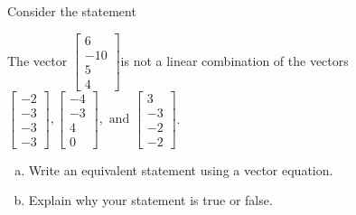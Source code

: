 
\begin{exerciseStatement}


Consider the statement 
\begin{center}\begin{minipage}{0.8\textwidth}
 The vector \( \left[\begin{array}{c}
6 \\
-10 \\
5 \\
4
\end{array}\right] \)is not a linear combination of the vectors \( \left[\begin{array}{c}
-2 \\
-3 \\
-3 \\
-3
\end{array}\right] , \left[\begin{array}{c}
-4 \\
-3 \\
4 \\
0
\end{array}\right] , \text{ and } \left[\begin{array}{c}
3 \\
-3 \\
-2 \\
-2
\end{array}\right] \). 
\end{minipage}\end{center}
    


\begin{enumerate}[(a)]
\item  Write an equivalent statement using a vector equation.
\item  Explain why your statement is true or false.
\end{enumerate}
    
\end{exerciseStatement}
    
